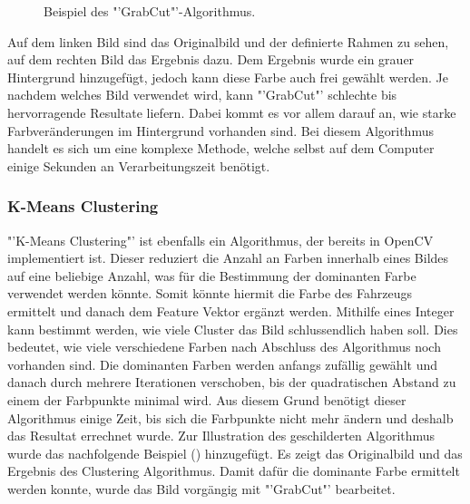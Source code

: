 {\begin{figure}[H]
  \centering
  \caption{Beispiel des "'GrabCut"'-Algorithmus.}
  \label{bGrabCut}
\end{figure}

Auf dem linken Bild sind das Originalbild und der definierte Rahmen zu sehen, auf dem rechten Bild das Ergebnis dazu. Dem Ergebnis wurde ein grauer Hintergrund hinzugefügt, jedoch kann diese Farbe auch frei gewählt werden. Je nachdem welches Bild verwendet wird, kann "'GrabCut"' schlechte bis hervorragende Resultate liefern. Dabei kommt es vor allem darauf an, wie starke Farbveränderungen im Hintergrund vorhanden sind. Bei diesem Algorithmus handelt es sich um eine komplexe Methode, welche selbst auf dem Computer einige Sekunden an Verarbeitungszeit benötigt. \cite{GrabCut}

\subsubsection{K-Means Clustering}
"'K-Means Clustering"' ist ebenfalls ein Algorithmus, der bereits in OpenCV implementiert ist. Dieser reduziert die Anzahl an Farben innerhalb eines Bildes auf eine beliebige Anzahl, was für die Bestimmung der dominanten Farbe verwendet werden könnte. Somit könnte hiermit die Farbe des Fahrzeugs ermittelt und danach dem Feature Vektor ergänzt werden. Mithilfe eines Integer kann bestimmt werden, wie viele Cluster das Bild schlussendlich haben soll. Dies bedeutet, wie viele verschiedene Farben nach Abschluss des Algorithmus noch vorhanden sind. Die dominanten Farben werden anfangs zufällig gewählt und danach durch mehrere Iterationen verschoben, bis der quadratischen Abstand zu einem der Farbpunkte minimal wird. Aus diesem Grund benötigt dieser Algorithmus einige Zeit, bis sich die Farbpunkte nicht mehr ändern und deshalb das Resultat errechnet wurde.
\newpage
Zur Illustration des geschilderten Algorithmus wurde das nachfolgende Beispiel () hinzugefügt. Es zeigt das Originalbild und das Ergebnis des Clustering Algorithmus. Damit dafür die dominante Farbe ermittelt werden konnte, wurde das Bild vorgängig mit "'GrabCut"' bearbeitet.

}
